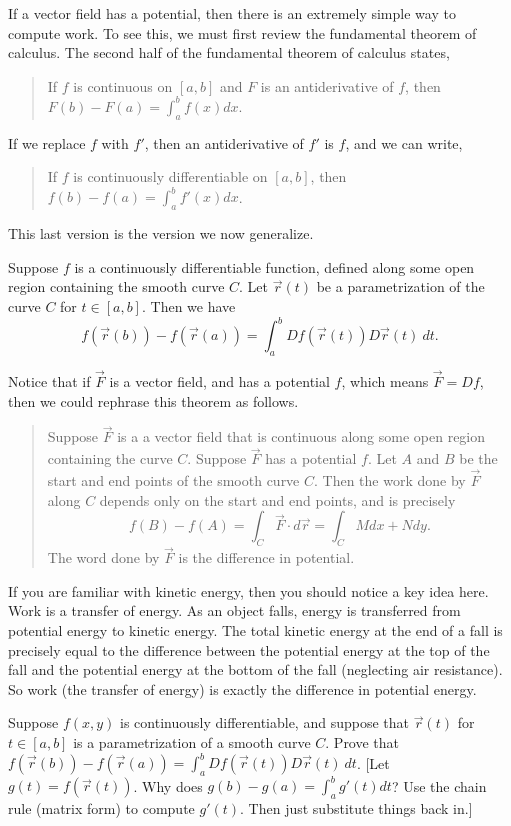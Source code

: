 If a vector field has a potential, then there is an extremely simple way to compute work. To see this, we must first review the fundamental theorem of calculus. The second half of the fundamental theorem of calculus states,
\begin{quote}
 If $f$ is continuous on $[a,b]$ and $F$ is an antiderivative of $f$, then $F(b)-F(a) = \int_a^b f(x) dx$.
\end{quote}
If we replace $f$ with $f'$, then an antiderivative of $f'$ is $f$, and we can write,
\begin{quote}
 If $f$ is continuously differentiable on $[a,b]$, then $f(b)-f(a)=\int_a^b f'(x) dx$.
\end{quote}
This last version is the version we now generalize.

\begin{theorem}
%
 Suppose $f$ is a continuously differentiable function, defined along some open region containing the smooth curve $C$. Let $\vec r(t)$ be a parametrization of the curve $C$ for $t\in[a,b]$. Then we have
$$f(\vec r(b))-f(\vec r(a))=\int_a^b Df(\vec r(t))D\vec r(t)\ dt.$$
\end{theorem}
Notice that if $\vec F$ is a vector field, and has a potential $f$, which means $\vec F = Df$, then we could rephrase this theorem as follows. 
\begin{quote}
 Suppose $\vec F$ is a a vector field that is continuous along some open region containing the curve $C$. Suppose $\vec F$ has a potential $f$. Let $A$ and $B$ be the start and end points of the smooth curve $C$.  Then the work done by $\vec F$ along $C$ depends only on the start and end points, and is precisely
$$f(B)-f(A)=\int_C \vec F\cdot d\vec r = \int_C Mdx+Ndy.$$
 The word done by $\vec F$ is the difference in potential.
\end{quote}
If you are familiar with kinetic energy, then you should notice a key idea here.  Work is a transfer of energy. As an object falls, energy is transferred from potential energy to kinetic energy.  The total kinetic energy at the end of a fall is precisely equal to the difference between the potential energy at the top of the fall and the potential energy at the bottom of the fall (neglecting air resistance). So work (the transfer of energy) is exactly the difference in potential energy.  

\begin{problem}
 Suppose $f(x,y)$ is continuously differentiable, and suppose that $\vec r(t)$ for $t\in[a,b]$ is a parametrization of a smooth curve $C$. Prove that $f(\vec r(b))-f(\vec r(a)) = \int_a^b Df(\vec r(t))D\vec r(t)\ dt$. [Let $g(t) = f(\vec r(t))$. Why does $g(b)-g(a) = \int_a^b g'(t)dt$? Use the chain rule (matrix form) to compute $g'(t)$. Then just substitute things back in.]  
\end{problem}

